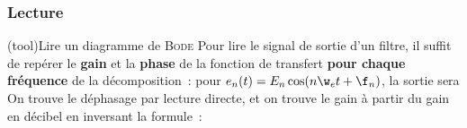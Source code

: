 \documentclass[../../main/main.tex]{subfiles}
\begin{document}
\subsubsection{Lecture}
\begin{tcb*}[breakable](tool){Lire un diagramme de \textsc{Bode}}
	Pour lire le signal de sortie d'un filtre, il suffit de repérer le \textbf{gain}
	et la \textbf{phase} de la fonction de transfert \textbf{pour chaque fréquence}
	de la décomposition~: pour $e_n(t) = E_n \cos(n\w_et + \f_n)$, la sortie sera
	\psw{%
		\[
			s_n(t) = \abs{\Hu(n\w_e)} E_n \cos(\wt + \f_n + \arg*{\Hu(n\w_e)})
		\]
	}
	On trouve le déphasage par lecture directe, et on trouve le gain à partir du
	gain en décibel en inversant la formule~:
	\psw{%
		\[
			G\ind{dB}(\w) = 20 \log \abs{\Hu(\w)}
			\Lra
			\abs{\Hu(\w)} = 10^{G\ind{dB}(\w)/20}
		\]
	}
	\vspace{-15pt}
\end{tcb*}

\end{document}
